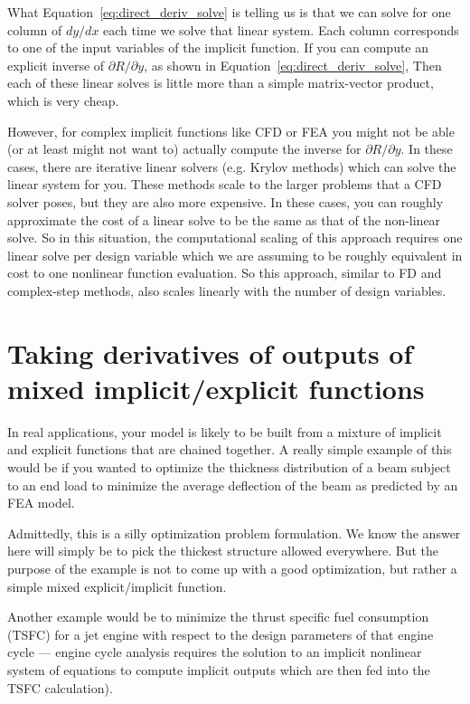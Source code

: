 \documentclass[conf]{new-aiaa}
\begin{document}
    What Equation~\eqref{eq:direct_deriv_solve} is telling us is that we can solve for one column of $dy/dx$ each time we solve that linear system. 
    Each column corresponds to one of the input variables of the implicit function. 
    If you can compute an explicit inverse of $\partial R/\partial y$, as shown in Equation~\eqref{eq:direct_deriv_solve},
    Then each of these linear solves is little more than a simple matrix-vector product, which is very cheap. 
    
    However, for complex implicit functions like CFD or FEA you might not be able (or at least might not want to) actually compute the inverse for $\partial R/\partial y$. 
    In these cases, there are iterative linear solvers (e.g. Krylov methods) which can solve the linear system for you. 
    These methods scale to the larger problems that a CFD solver poses, but they are also more expensive. 
    In these cases, you can roughly approximate the cost of a linear solve to be the same as that of the non-linear solve. 
    So in this situation, the computational scaling of this approach requires one linear solve per design variable which we are assuming to be roughly equivalent in cost to one nonlinear function evaluation. 
    So this approach, similar to FD and complex-step methods, also scales linearly with the number of design variables. 



    \section{Taking derivatives of outputs of mixed implicit/explicit functions}

    In real applications, your model is likely to be built from a mixture of implicit and explicit functions that are chained together.
    A really simple example of this would be if you wanted to optimize the thickness distribution of a beam subject to an end load to minimize the average deflection of the beam as predicted by an FEA model. 
    
    Admittedly, this is a silly optimization problem formulation. 
    We know the answer here will simply be to pick the thickest structure allowed everywhere. 
    But the purpose of the example is not to come up with a good optimization, but rather a simple mixed explicit/implicit function. 
    
    Another example would be to minimize the thrust specific fuel consumption (TSFC) for a jet engine with respect to the design parameters of that engine cycle --- engine cycle analysis requires the solution to an implicit nonlinear system of equations to compute implicit outputs which are then fed into the TSFC calculation). 
\end{document}
